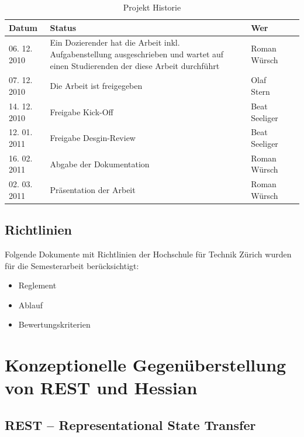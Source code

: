 \documentclass[abstracton, listof=totocnumbered,
bibliography=totocnumbered]{scrreprt}
\begin{document}
  \begin{table}[h]
    \begin{center}
      \begin{tabular}{lp{9cm}ll}
        \toprule
        Datum & Status & Wer \\
        \midrule
        06. 12. 2010 & Ein Dozierender hat die Arbeit inkl. Aufgabenstellung
        ausgeschrieben und wartet auf einen Studierenden der diese Arbeit
        durchführt & Roman Würsch\\
        07. 12. 2010 & Die Arbeit ist freigegeben & Olaf Stern\\
        14. 12. 2010 & Freigabe Kick-Off & Beat Seeliger\\
        12. 01. 2011 & Freigabe Desgin-Review & Beat Seeliger\\
        16. 02. 2011 & Abgabe der Dokumentation & Roman Würsch\\
        02. 03. 2011 & Präsentation der Arbeit & Roman Würsch\\
        \bottomrule
      \end{tabular}
      \caption{Projekt Historie}
      \label{tab:projekthistorie}
    \end{center}
  \end{table}
  
  \section{Richtlinien}
  Folgende Dokumente mit Richtlinien der Hochschule für Technik Zürich 
  wurden für die Semesterarbeit berücksichtigt:

  \begin{itemize}
      \item Reglement \cite{hsz_reglement}
      \item Ablauf \cite{hsz_ablauf}
      \item Bewertungskriterien \cite{hsz_bewertungskriterien}
  \end{itemize} 
  
  \newpage
  
  \chapter{Konzeptionelle Gegenüberstellung von REST und Hessian}
  
  \section{REST – Representational State Transfer}
  
\end{document}
